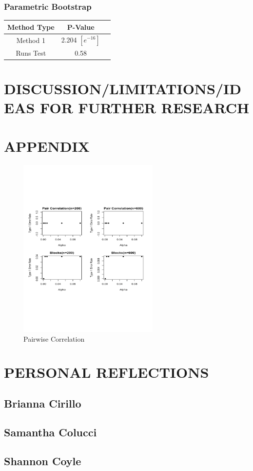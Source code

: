 \documentclass[12pt, letterpaper]{article}
\begin{document}
\subsubsection{Parametric Bootstrap}

\begin{tabular}{|c|c|c|}
\hline
\textbf{Method Type} & P-Value  \\
\hline
Method 1 & 2.204 $[e^{-16}]$ \\
\hline
Runs Test & 0.58 \\ 
\hline
\end{tabular}


\section{DISCUSSION/LIMITATIONS/IDEAS FOR FURTHER RESEARCH}


\section{APPENDIX}
\begin{figure}
\centering
\includegraphics[width=7cm]{Pari Correlation.pdf}
\caption{Pairwise Correlation}
\label{fig: Pair Correlation Plot}
\end{figure}

\section{PERSONAL REFLECTIONS}
\subsection{Brianna Cirillo}
\subsection{Samantha Colucci}
\subsection{Shannon Coyle}
\end{document}
